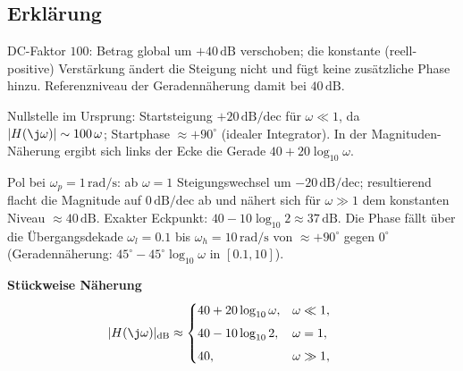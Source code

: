 \subsection{Erklärung}
\vspace{5mm}
\begin{description}[leftmargin=1.2em,labelsep=.6em,font=\bfseries]
\item[Schritt 1] DC-Faktor $100$: Betrag global um $+40\,\mathrm{dB}$ verschoben; die konstante (reell-positive) Verstärkung ändert die Steigung nicht und fügt keine zusätzliche Phase hinzu. Referenzniveau der Geradennäherung damit bei $40\,\mathrm{dB}$.
\item[Schritt 2] Nullstelle im Ursprung: Startsteigung $+20\,\mathrm{dB/dec}$ für $\omega\ll1$, da $|H(\j\omega)|\sim100\,\omega$; Startphase $\approx+90^\circ$ (idealer Integrator). In der Magnituden-Näherung ergibt sich links der Ecke die Gerade $40+20\log_{10}\omega$.
\item[Schritt 3] Pol bei $\omega_p=1\,\mathrm{rad/s}$: ab $\omega=1$ Steigungswechsel um $-20\,\mathrm{dB/dec}$; resultierend flacht die Magnitude auf $0\,\mathrm{dB/dec}$ ab und nähert sich für $\omega\gg1$ dem konstanten Niveau $\approx40\,\mathrm{dB}$. Exakter Eckpunkt: $40-10\log_{10}2\approx37\,\mathrm{dB}$. Die Phase fällt über die Übergangsdekade $\omega_l=0.1$ bis $\omega_h=10\,\mathrm{rad/s}$ von $\approx+90^\circ$ gegen $0^\circ$ (Geradennäherung: $45^\circ-45^\circ\log_{10}\omega$ in $[0.1,10]$).
\end{description}

\vspace{0.5cm}
\medskip
\noindent\textbf{Stückweise Näherung}
\[
|H(\j\omega)|_{\mathrm{dB}}\approx
\begin{cases}
40+20\log_{10}\omega,& \omega\ll1,\\[4pt]
40-10\log_{10}2,& \omega=1,\\[4pt]
40,& \omega\gg1,
\end{cases}
\qquad
\]
\newpage